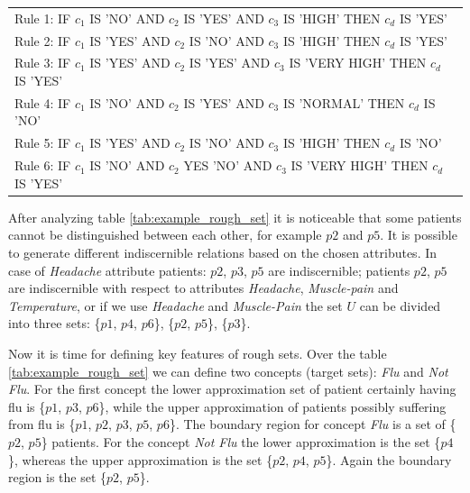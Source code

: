 \begin{tabular}[H]{l}
    Rule 1:  IF $c_1$ IS 'NO' AND $c_2$ IS 'YES' AND $c_3$ IS 'HIGH' THEN $c_d$
    IS 'YES' \\
    Rule 2:  IF $c_1$ IS 'YES' AND $c_2$ IS 'NO' AND $c_3$ IS 'HIGH' THEN $c_d$
    IS 'YES' \\
    Rule 3:  IF $c_1$ IS 'YES' AND $c_2$ IS 'YES' AND $c_3$ IS 'VERY HIGH' THEN
    $c_d$ IS 'YES' \\
    Rule 4:  IF $c_1$ IS 'NO' AND $c_2$ IS 'YES' AND $c_3$ IS 'NORMAL' THEN
    $c_d$ IS 'NO' \\
    Rule 5:  IF $c_1$ IS 'YES' AND $c_2$ IS 'NO' AND $c_3$ IS 'HIGH' THEN $c_d$
    IS 'NO' \\
    Rule 6:  IF $c_1$ IS 'NO' AND $c_2$ YES 'NO' AND $c_3$ IS 'VERY HIGH' THEN
    $c_d$ IS 'YES'  
\end{tabular}


After analyzing table \ref{tab:example_rough_set} it is noticeable that some
patients cannot be distinguished between each other, for example $p2$ and $p5$.
It is possible to generate different indiscernible relations based on 
the chosen attributes. In case of \textit{Headache} attribute patients: $p2$,
$p3$, $p5$ are indiscernible; patients $p2$, $p5$ are
indiscernible with respect to attributes \textit{Headache},
\textit{Muscle-pain} and \textit{Temperature}, or if we use \textit{Headache}
and \textit{Muscle-Pain} the set $U$ can be divided into three sets:
\{$p1$, $p4$, $p6$\}, \{$p2$, $p5$\}, \{$p3$\}.

Now it is time for defining key features of rough sets. Over the table
\ref{tab:example_rough_set} we can define two concepts (target sets):
\textit{Flu} and \textit{Not Flu}. For the first concept the lower approximation
set of patient certainly having flu is \{$p1$, $p3$, $p6$\}, while the upper
approximation of patients possibly suffering from flu is \{$p1$, $p2$, $p3$,
$p5$, $p6$\}. The boundary region for concept \textit{Flu} is a set of \{$p2$, $p5$\} 
patients. For the concept \textit{Not Flu} the lower approximation is the set
\{$p4$\}, whereas the upper approximation is the set \{$p2$, $p4$, $p5$\}. Again the 
boundary region is the set \{$p2$, $p5$\}.

